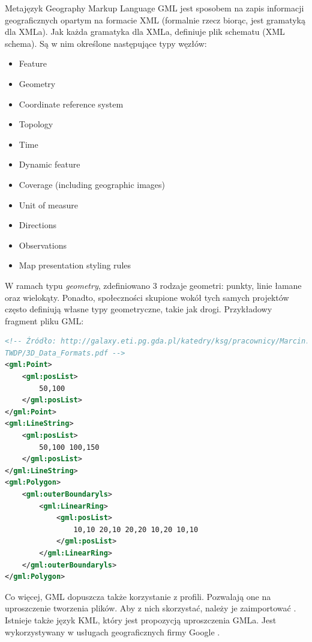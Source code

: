 Metajęzyk Geography Markup Language GML jest sposobem na zapis informacji geograficznych opartym na formacie XML (formalnie rzecz biorąc, jest gramatyką dla XMLa).
Jak każda gramatyka dla XMLa, definiuje plik schematu (XML schema). Są w nim określone następujące typy węzłów:
\begin{itemize}
    \item Feature
    \item Geometry
    \item Coordinate reference system
    \item Topology
    \item Time
    \item Dynamic feature
    \item Coverage (including geographic images)
    \item Unit of measure
    \item Directions
    \item Observations
    \item Map presentation styling rules
\end{itemize}

W ramach typu \textit{geometry}, zdefiniowano 3 rodzaje geometri: punkty, linie łamane oraz wielokąty.
Ponadto, społeczności skupione wokół tych samych projektów często definiują własne typy geometryczne, takie jak drogi.
Przykładowy fragment pliku GML:

\begin{lstlisting}[frame=L, language=xml]
<!-- Źródło: http://galaxy.eti.pg.gda.pl/katedry/ksg/pracownicy/Marcin.Kulawiak/
TWDP/3D_Data_Formats.pdf -->
<gml:Point>
    <gml:posList>
        50,100
    </gml:posList>
</gml:Point>
<gml:LineString>
    <gml:posList>
        50,100 100,150
    </gml:posList>
</gml:LineString>
<gml:Polygon>
    <gml:outerBoundaryls>
        <gml:LinearRing>
            <gml:posList>
                10,10 20,10 20,20 10,20 10,10
            </gml:posList>
        </gml:LinearRing>
    </gml:outerBoundaryls>
</gml:Polygon>
\end{lstlisting}

Co więcej, GML dopuszcza także korzystanie z profili. Pozwalają one na uproszczenie tworzenia plików. Aby z nich skorzystać, należy je zaimportować \cite{OpeGIS_GML2007}.
Istnieje także język KML, który jest propozycją uproszczenia GMLa. Jest wykorzystywany w usługach geograficznych firmy Google \cite{kulawiak2014}.

